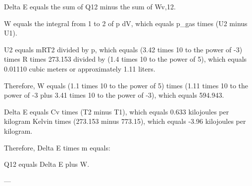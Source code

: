 Delta E equals the sum of Q12 minus the sum of Wv,12.  

W equals the integral from 1 to 2 of p dV, which equals p_gas times (U2 minus U1).  

U2 equals mRT2 divided by p, which equals (3.42 times 10 to the power of -3) times R times 273.153 divided by (1.4 times 10 to the power of 5), which equals 0.01110 cubic meters or approximately 1.11 liters.  

Therefore, W equals (1.1 times 10 to the power of 5) times (1.11 times 10 to the power of -3 plus 3.41 times 10 to the power of -3), which equals 594.943.  

Delta E equals Cv times (T2 minus T1), which equals 0.633 kilojoules per kilogram Kelvin times (273.153 minus 773.15), which equals -3.96 kilojoules per kilogram.  

Therefore, Delta E times m equals:  

Q12 equals Delta E plus W.  

---